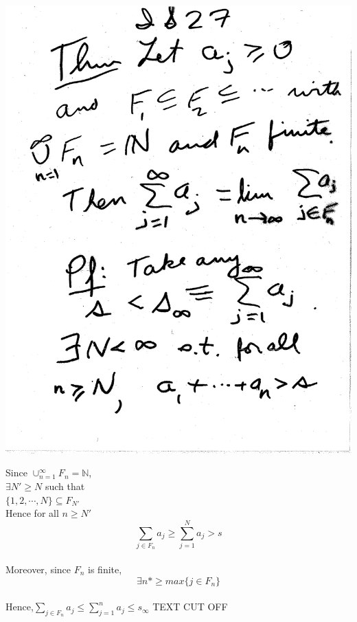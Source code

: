 \documentclass[10pt,a4paper]{article}
\begin{document}
{{\includegraphics[scale=.5]{Pages/IS_27}

\newpage

\noindent Since $ \cup_{n=1}^{\infty} F_n = \mathbb{N}$, 
\\ $ \exists N' \geq N$ such that
\\ $\{1,2, \cdots, N\} \subseteq F_{N'}$ 
\\ Hence for all $ n \geq N'$
$$ \sum_{j \in F_n} a_j \geq \sum_{j=1}^{N} a_j > s $$
\\ \noindent Moreover, since $F_n$ is finite, 
$$\exists n* \geq max \{ j \in F_n \}$$
\\ Hence,$\sum_{ j \in F_n } a_j \leq \sum_{j=1}^{n} a_j \leq s_\infty $ \color{blue} TEXT CUT OFF \color{black}

}}
\end{document}
